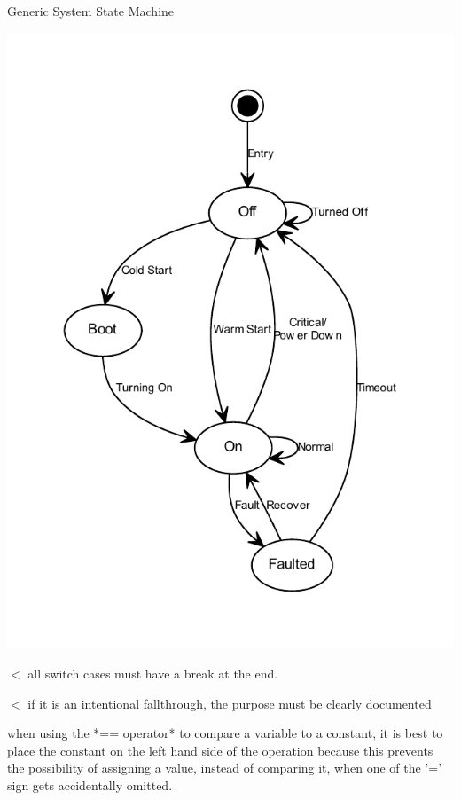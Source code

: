Generic System State Machine \begin{center}

\begin{DoxyImageNoCaption}
  \mbox{\includegraphics[width=\textwidth]{dot_inline_dotgraph_2}}
\end{DoxyImageNoCaption}
\end{center}


$<$ all switch cases must have a break at the end.

$<$ if it is an intentional fallthrough, the purpose must be clearly documented

\begin{DoxyVerb}            when using the *== operator* to compare a variable to a constant, 
            it is best to place the constant on the left hand side of the operation
            because this prevents the possibility of assigning a value, instead of 
            comparing it, when one of the '=' sign gets accidentally omitted.\end{DoxyVerb}


